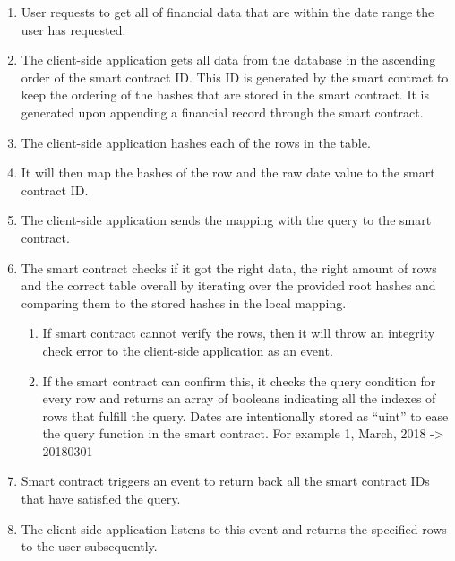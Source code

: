 \begin{enumerate}
	\item User requests to get all of financial data that are within the date range the user has requested.
	\item The client-side application gets all data from the database in the ascending order of the smart contract ID. This ID is generated by the smart contract to keep the ordering of the hashes that are stored in the smart contract. It is generated upon appending a financial record through the smart contract.
	\item The client-side application hashes each of the rows in the table.
	\item It will then map the hashes of the row and the raw date value to the smart contract ID.
	\item The client-side application sends the mapping with the query to the smart contract.
	\item The smart contract checks if it got the right data, the right amount of rows and the correct table overall by iterating over the provided root hashes and comparing them to the stored hashes in the local mapping.
		\begin{enumerate}
		\item If smart contract cannot verify the rows, then it will throw an integrity check error to the client-side application as an event.
		\item If the smart contract can confirm this, it checks the query condition for every row and returns an array of booleans indicating all the indexes of rows that fulfill the query. Dates are intentionally stored as “uint” to ease the query function in the smart contract. For example 1, March, 2018 -> 20180301
		\end{enumerate}
	\item Smart contract triggers an event to return back all the smart contract IDs that have satisfied the query.
	\item The client-side application listens to this event and returns the specified rows to the user subsequently.
\end{enumerate}
